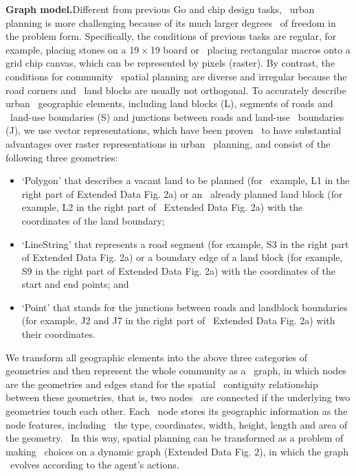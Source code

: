 \textbf{Graph model.}Different from previous Go and chip design tasks, \
urban planning is more challenging because of its much larger degrees \
of freedom in the problem form. Specifically, the conditions of previous tasks are regular, for example, placing stones on a 19 × 19 board or \
placing rectangular macros onto a grid chip canvas, which can be represented by pixels (raster). By contrast, the conditions for community \
spatial planning are diverse and irregular because the road corners and \
land blocks are usually not orthogonal. To accurately describe urban \
geographic elements, including land blocks (L), segments of roads and \
land-use boundaries (S) and junctions between roads and land-use \
boundaries (J), we use vector representations, which have been proven \
to have substantial advantages over raster representations in urban \
planning, and consist of the following three geometries:
\begin{itemize}
    \item  ‘Polygon’ that describes a vacant land to be planned (for \
    example, L1 in the right part of Extended Data Fig. 2a) or an \
    already planned land block (for example, L2 in the right part of \
    Extended Data Fig. 2a) with the coordinates of the land boundary;
    \item ‘LineString’ that represents a road segment (for example, S3 in 
    the right part of Extended Data Fig. 2a) or a boundary edge of a 
    land block (for example, S9 in the right part of Extended Data 
    Fig. 2a) with the coordinates of the start and end points; and
    \item ‘Point’ that stands for the junctions between roads and landblock boundaries (for example, J2 and J7 in the right part of \
    Extended Data Fig. 2a) with their coordinates.
\end{itemize}

We transform all geographic elements into the above three categories of geometries and then represent the whole community as a \
graph, in which nodes are the geometries and edges stand for the spatial \
contiguity relationship between these geometries, that is, two nodes \
are connected if the underlying two geometries touch each other. Each \
node stores its geographic information as the node features, including \
the type, coordinates, width, height, length and area of the geometry. \
In this way, spatial planning can be transformed as a problem of making \
choices on a dynamic graph (Extended Data Fig. 2), in which the graph \
evolves according to the agent’s actions.

